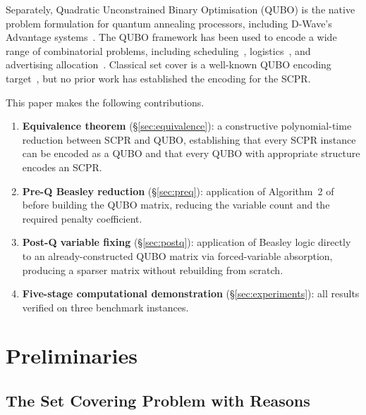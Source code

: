\documentclass[11pt,a4paper]{article}
\theoremstyle{plain}
\theoremstyle{definition}
\theoremstyle{remark}
\newcommand{\SCPR}{\textup{SCPR}}
\newcommand{\QUBO}{\textup{QUBO}}
\begin{document}
Separately, Quadratic Unconstrained Binary Optimisation (\QUBO{}) is the native problem
formulation for quantum annealing processors, including D-Wave's Advantage
systems~\cite{dwave2023}.
The \QUBO{} framework has been used to encode a wide range of combinatorial problems,
including scheduling~\cite{pfg2022}, logistics~\cite{portla2022}, and advertising
allocation~\cite{recruit2022}.
Classical set cover is a well-known \QUBO{} encoding target~\cite{glover2018qubo},
but no prior work has established the encoding for the \SCPR{}.

This paper makes the following contributions.

\begin{enumerate}[leftmargin=*, label=\arabic*.]
  \item \textbf{Equivalence theorem} (\S\ref{sec:equivalence}): a constructive
        polynomial-time reduction between \SCPR{} and \QUBO{}, establishing that every
        \SCPR{} instance can be encoded as a \QUBO{} and that every \QUBO{} with
        appropriate structure encodes an \SCPR{}.

  \item \textbf{Pre-Q Beasley reduction} (\S\ref{sec:preq}): application of
        Algorithm~2 of~\cite{babatunde2025thesis} before building the \QUBO{} matrix,
        reducing the variable count and the required penalty coefficient.

  \item \textbf{Post-Q variable fixing} (\S\ref{sec:postq}): application of Beasley
        logic directly to an already-constructed \QUBO{} matrix via forced-variable
        absorption, producing a sparser matrix without rebuilding from scratch.

  \item \textbf{Five-stage computational demonstration} (\S\ref{sec:experiments}):
        all results verified on three benchmark instances.
\end{enumerate}

\section{Preliminaries}
\label{sec:prelim}

\subsection{The Set Covering Problem with Reasons}
\end{document}
